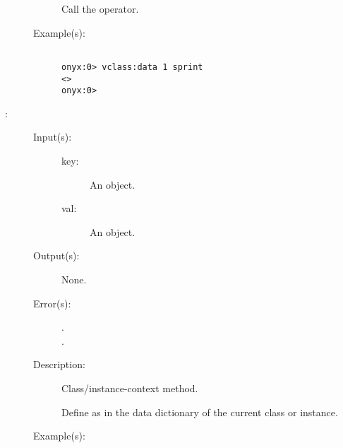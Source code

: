\begin{description}
\begin{description}
		Call the  operator.
	\item[Example(s): ]\begin{verbatim}

onyx:0> vclass:data 1 sprint
<>
onyx:0>
		\end{verbatim}
	\end{description}
\label{vclass:def}
\item[{\onyxop{key val}{def}{--}}: ]
	\begin{description}\item[]
	\item[Input(s): ]
		\begin{description}\item[]
		\item[key: ]
			An object.
		\item[val: ]
			An object.
		\end{description}
	\item[Output(s): ] None.
	\item[Error(s): ]
		\begin{description}\item[]
		\item[.]
		\item[.]
		\end{description}
	\item[Description: ]
		Class/instance-context method.

		Define  as  in the data dictionary of the
		current class or instance.
	\item[Example(s): ]\begin{verbatim}


\end{verbatim}
\end{description}
\end{description}
